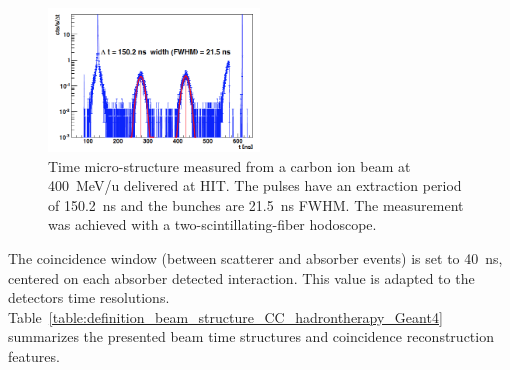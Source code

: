 	\begin{figure} [!hbtp]	
	\centering
	\includegraphics[width=0.5\textwidth]{./Figure/2013_Structure_Time_Beam_400MeV.png}
	\caption{Time micro-structure measured from a carbon ion beam at 400~MeV/u delivered at HIT. The pulses have an extraction period of 150.2~ns and the bunches are 21.5~ns FWHM. The measurement was achieved with a two-scintillating-fiber hodoscope.}
	\label{fig:fig_structure_temps_faisceau_HIT_2013_CC_simulation_Hadronth}
	\end{figure}


The coincidence window (between scatterer and absorber events) is set to 40~ns, centered on each absorber detected interaction. This value is adapted to the detectors time resolutions.\\ 
Table~\ref{table:definition_beam_structure_CC_hadrontherapy_Geant4} summarizes the presented beam time structures and coincidence reconstruction features.

